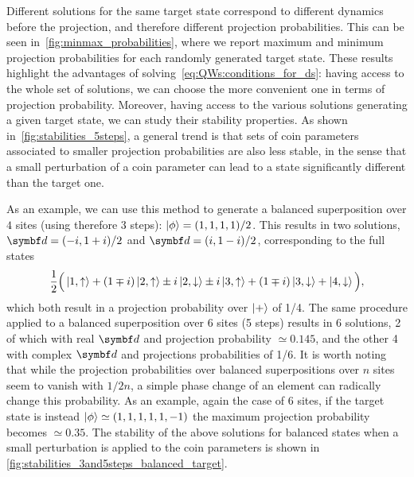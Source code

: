 Different solutions for the same target state correspond to different dynamics before the projection, and therefore different projection probabilities.
This can be seen in~\cref{fig:minmax_probabilities}, where we report maximum and minimum projection probabilities for each randomly generated target state.
These results highlight the advantages of solving~\cref{eq:QWs:conditions_for_ds}: having access to the whole set of solutions, we can choose the more convenient one in terms of projection probability.
Moreover, having access to the various solutions generating a given target state, we can study their stability properties.
As shown in~\cref{fig:stabilities_5steps}, a general trend is that sets of coin parameters associated to smaller projection probabilities are also less stable, in the sense that a small perturbation of a coin parameter can lead to a state significantly different than the target one.

As an example, we can use this method to generate a balanced superposition over $4$ sites (using therefore $3$ steps): $\ket\phi = (1, 1, 1, 1) / 2$.
This results in two solutions, $\bs d = (-i, 1+i)/2$ and $\bs d = (i, 1 - i)/2$,
corresponding to the full states
\begin{equation}
	\frac{1}{2}\Big(
		\ket{1,\uparrow} + 
		(1 \mp i) \ket{2,\uparrow} \pm i \ket{2, \downarrow}
		\pm i \ket{3, \uparrow} + (1 \mp i) \ket{3, \downarrow} +
		\ket{4, \downarrow}
	\Big),
\end{equation}
which both result in a projection probability over $\ket+$ of 1/4.
The same procedure applied to a balanced superposition over 6 sites (5 steps) results in 6 solutions, 2 of which with real $\bs d$ and projection probability $\simeq 0.145$, and the other 4 with complex $\bs d$ and projections probabilities of 1/6.
It is worth noting that while the projection probabilities over balanced superpositions over $n$ sites seem to vanish with $1/2n$, a simple phase change of an element can radically change this probability.
As an example, again the case of 6 sites, if the target state is instead $\ket\phi \simeq (1,1,1,1,1,-1)$ the maximum projection probability becomes $\simeq 0.35$.
The stability of the above solutions for balanced states when a small perturbation is applied to the coin parameters is shown in \cref{fig:stabilities_3and5steps_balanced_target}.


